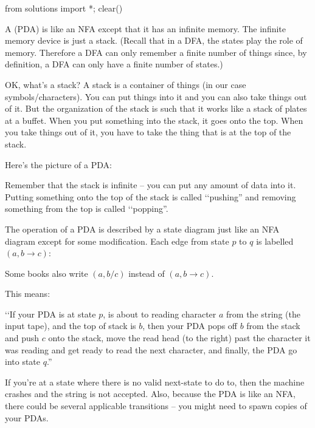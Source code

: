 \begin{python0}
from solutions import *; clear()
\end{python0}

A  (PDA) is like an NFA except that it has
an infinite memory. The infinite memory device is just a stack.
(Recall that in a DFA, the states play the role of memory.
Therefore a DFA can only remember a finite number of things since, by definition, a DFA
can only have a finite number of states.)

OK, what's a stack?
A stack is a container of things (in our case symbols/characters).
You can put things into it and you can also take things out of it.
But the organization of the stack is such that it works like a stack
of plates at a buffet.
When you put something into the stack, it goes onto the top.
When you take things out of it, you have to take the thing that is
at the top of the stack.

Here's the picture of a PDA:



Remember that the stack is infinite -- you can put any amount of data into it.
Putting something onto the top of the stack is called \lq\lq pushing''
and removing something from the top is called \lq\lq popping''.

The operation of a PDA is described by a state diagram just like
an NFA diagram except for some modification.
Each edge from state $p$ to $q$ is labelled
$(a, b \rightarrow c)$:



Some books also write
$(a,b/c)$
instead of
$(a, b \rightarrow c)$.

This means:
\begin{tightlist}
  \item []
  \lq\lq If your PDA is at state $p$, is about to reading character $a$ from the string
  (the input tape), and the top of stack is $b$, then your PDA  pops off
  $b$ from the stack and push $c$ onto the stack,
  move the read head (to the right) past 
  the character it was reading and 
  get ready to read the next character,
  and finally, the PDA go into state $q$.''
\end{tightlist}
If you're at a state where there is no valid next-state to do to,
then the machine crashes and the string is not accepted.
Also, because the PDA is like an NFA, there could be several
applicable transitions -- you might need to spawn copies of your PDAs.

